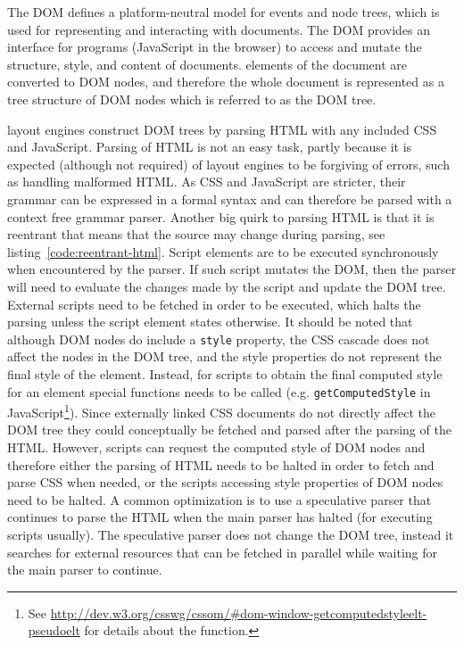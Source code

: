 \documentclass[a4paper,11pt]{kth-mag}
\newcommand{\code}[1]{\texttt{#1}}
\begin{document}
        The \gls{DOM} defines a platform-neutral model for events and node trees, which is used for representing and interacting with \glspl{document}.
        The \gls{DOM} provides an interface for programs (\gls{JavaScript} in the \gls{browser}) to access and mutate the structure, style, and content of \glspl{document}.
        \Glspl{element} of the \gls{document} are converted to \gls{DOM} nodes, and therefore the whole \gls{document} is represented as a tree structure of \gls{DOM} nodes which is referred to as the \gls{DOM} tree.

        \Glspl{layout engine} construct \gls{DOM} trees by parsing \gls{HTML} with any included \gls{CSS} and \gls{JavaScript}.
        Parsing of \gls{HTML} is not an easy task, partly because it is expected (although not required) of \glspl{layout engine} to be forgiving of errors, such as handling malformed \gls{HTML}.
        As \gls{CSS} and \gls{JavaScript} are stricter, their grammar can be expressed in a formal syntax and can therefore be parsed with a context free grammar parser.
        Another big quirk to parsing \gls{HTML} is that it is reentrant that means that the source may change during parsing, see listing~\ref{code:reentrant-html}.
        Script \glspl{element} are to be executed synchronously when encountered by the parser.
        If such script mutates the \gls{DOM}, then the parser will need to evaluate the changes made by the script and update the \gls{DOM} tree.
        External scripts need to be fetched in order to be executed, which halts the parsing unless the script \gls{element} states otherwise.
        It should be noted that although \gls{DOM} nodes do include a \code{style} property, the \gls{CSS} cascade does not affect the nodes in the \gls{DOM} tree, and the style properties do not represent the final style of the \gls{element}.
        Instead, for scripts to obtain the final computed style for an \gls{element} special functions needs to be called (e.g. \code{getComputedStyle} in \gls{JavaScript}\footnote{See \url{http://dev.w3.org/csswg/cssom/\#dom-window-getcomputedstyleelt-pseudoelt} for details about the function.}).
        Since externally linked \gls{CSS} \glspl{document} do not directly affect the \gls{DOM} tree they could conceptually be fetched and parsed after the parsing of the \gls{HTML}.
        However, scripts can request the computed style of \gls{DOM} nodes and therefore either the parsing of \gls{HTML} needs to be halted in order to fetch and parse \gls{CSS} when needed, or the scripts accessing style properties of \gls{DOM} nodes need to be halted.
        A common optimization is to use a speculative parser that continues to parse the \gls{HTML} when the main parser has halted (for executing scripts usually).
        The speculative parser does not change the \gls{DOM} tree, instead it searches for external resources that can be fetched in parallel while waiting for the main parser to continue.
\end{document}
